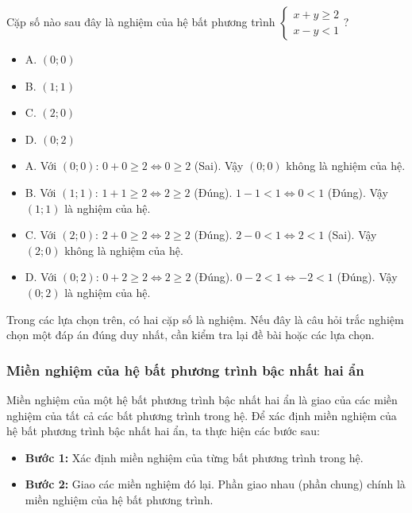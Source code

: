 \begin{emcothe}
Cặp số nào sau đây là nghiệm của hệ bất phương trình $\begin{cases} x + y \ge 2 \\ x - y < 1 \end{cases}$?
\begin{itemize}
    \item A. $(0; 0)$
    \item B. $(1; 1)$
    \item C. $(2; 0)$
    \item D. $(0; 2)$
\end{itemize}
\begin{itemize}
    \item A. Với $(0; 0)$:
    $0 + 0 \ge 2 \Leftrightarrow 0 \ge 2$ (Sai). Vậy $(0; 0)$ không là nghiệm của hệ.
    \item B. Với $(1; 1)$:
    $1 + 1 \ge 2 \Leftrightarrow 2 \ge 2$ (Đúng).
    $1 - 1 < 1 \Leftrightarrow 0 < 1$ (Đúng).
    Vậy $(1; 1)$ là nghiệm của hệ.
    \item C. Với $(2; 0)$:
    $2 + 0 \ge 2 \Leftrightarrow 2 \ge 2$ (Đúng).
    $2 - 0 < 1 \Leftrightarrow 2 < 1$ (Sai). Vậy $(2; 0)$ không là nghiệm của hệ.
    \item D. Với $(0; 2)$:
    $0 + 2 \ge 2 \Leftrightarrow 2 \ge 2$ (Đúng).
    $0 - 2 < 1 \Leftrightarrow -2 < 1$ (Đúng).
    Vậy $(0; 2)$ là nghiệm của hệ.
\end{itemize}
Trong các lựa chọn trên, có hai cặp số là nghiệm. Nếu đây là câu hỏi trắc nghiệm chọn một đáp án đúng duy nhất, cần kiểm tra lại đề bài hoặc các lựa chọn.
\end{emcothe}

\subsubsection{Miền nghiệm của hệ bất phương trình bậc nhất hai ẩn}

\begin{kienthuc}
Miền nghiệm của một hệ bất phương trình bậc nhất hai ẩn là giao của các miền nghiệm của tất cả các bất phương trình trong hệ.
Để xác định miền nghiệm của hệ bất phương trình bậc nhất hai ẩn, ta thực hiện các bước sau:
\begin{itemize}
    \item \textbf{Bước 1:} Xác định miền nghiệm của từng bất phương trình trong hệ.
    \item \textbf{Bước 2:} Giao các miền nghiệm đó lại. Phần giao nhau (phần chung) chính là miền nghiệm của hệ bất phương trình.
\end{itemize}
\end{kienthuc}

